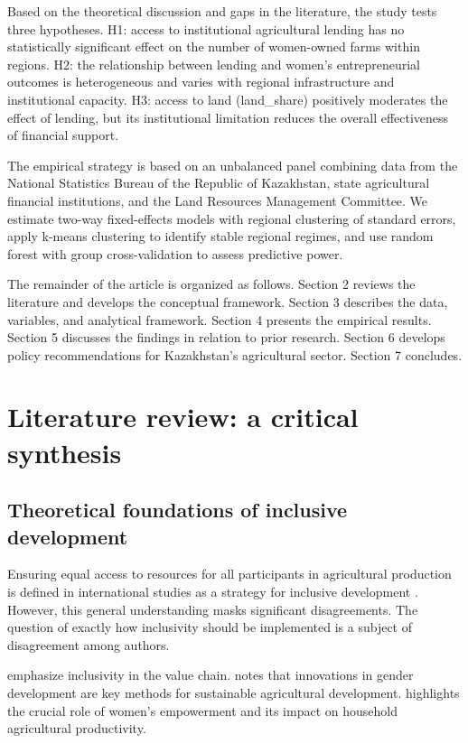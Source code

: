 \documentclass[pdflatex,sn-mathphys-ay]{sn-jnl}
\begin{document}
Based on the theoretical discussion and gaps in the literature, the study tests three hypotheses. H1: access to institutional agricultural lending has no statistically significant effect on the number of women-owned farms within regions. H2: the relationship between lending and women's entrepreneurial outcomes is heterogeneous and varies with regional infrastructure and institutional capacity. H3: access to land (land\_share) positively moderates the effect of lending, but its institutional limitation reduces the overall effectiveness of financial support.

The empirical strategy is based on an unbalanced panel combining data from the National Statistics Bureau of the Republic of Kazakhstan, state agricultural financial institutions, and the Land Resources Management Committee. We estimate two-way fixed-effects models with regional clustering of standard errors, apply k-means clustering to identify stable regional regimes, and use random forest with group cross-validation to assess predictive power.

The remainder of the article is organized as follows. Section 2 reviews the literature and develops the conceptual framework. Section 3 describes the data, variables, and analytical framework. Section 4 presents the empirical results. Section 5 discusses the findings in relation to prior research. Section 6 develops policy recommendations for Kazakhstan's agricultural sector. Section 7 concludes.

\section{Literature review: a critical synthesis}

\subsection{Theoretical foundations of inclusive development}

Ensuring equal access to resources for all participants in agricultural
production is defined in international studies as a strategy for
inclusive development \citep{ref29,ref44,ref77}. However, this general understanding masks
significant disagreements. The question of exactly how inclusivity
should be implemented is a subject of disagreement among authors.

\citet{ref81} emphasize inclusivity in the value chain.
\citet{ref24} notes that innovations in gender development are key
methods for sustainable agricultural development. \citet{ref27}
highlights the crucial role of women's empowerment and its impact on
household agricultural productivity.
\end{document}
